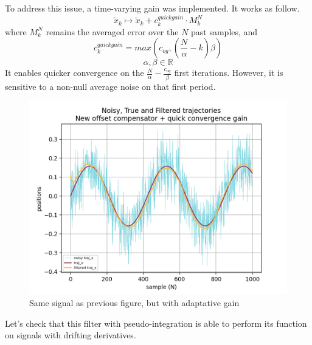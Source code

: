 \documentclass[a4paper,10pt]{article}
\begin{document}
To address this issue, a time-varying gain was implemented. It works as follow.
$$\widetilde{x}_k \mapsto \widetilde{x}_k + c_k^{quickgain} \cdot M_k^N$$
where $M_k^N$ remains the averaged error over the $N$ past samples, and
$$c_k^{quickgain} = max( c_{og} , (\frac{N}{\alpha} - k)\beta) $$
$$\alpha, \beta \in\mathbb{R}$$
It enables quicker convergence on the $\frac{N}{\alpha} - \frac{c_{og}}{\beta}$ first iterations. However, it is sensitive to a non-null average noise on that first period.

\begin{figure}[H]
\label{fig:complementary_filter_run_adaptative}
\centering
  \includegraphics[width=\linewidth, angle=0, scale=0.8]{./images/CF_test_sinus_3_QuickConvGain.png}
  \caption{Same signal as previous figure, but with adaptative gain}
\end{figure}

Let's check that this filter with pseudo-integration is able to perform its function on signals with drifting derivatives.
\end{document}
